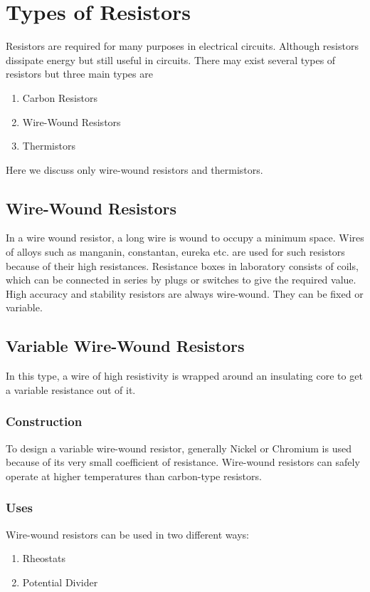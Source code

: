 \section{Types of Resistors}
Resistors are required for many purposes in electrical circuits. Although resistors dissipate energy but still useful in circuits. There may exist several types of resistors but three main types are
\begin{enumerate}[label=(\roman*)]
\item Carbon Resistors
\item Wire-Wound Resistors
\item Thermistors
\end{enumerate}
Here we discuss only wire-wound resistors and thermistors.
\subsection{Wire-Wound Resistors}
In a wire wound resistor, a long wire is wound to occupy a minimum space. Wires of alloys such as manganin, constantan, eureka etc. are used for such resistors because of their high resistances. Resistance boxes in laboratory consists of coils, which can be connected in series by plugs or switches to give the required value. High accuracy and stability resistors are always wire-wound. They can be fixed or variable.
\subsection*{Variable Wire-Wound Resistors}
In this type, a wire of high resistivity is wrapped around an insulating core to get a variable resistance out of it.
\subsubsection{Construction}
To design a  variable wire-wound resistor, generally Nickel or Chromium is used because of its very small coefficient of resistance. Wire-wound resistors can safely operate at higher temperatures than carbon-type resistors.
\subsubsection{Uses}
Wire-wound resistors can be used in two different ways:
\begin{enumerate}[label=(\roman*)]
\item Rheostats
\item Potential Divider
\end{enumerate}
